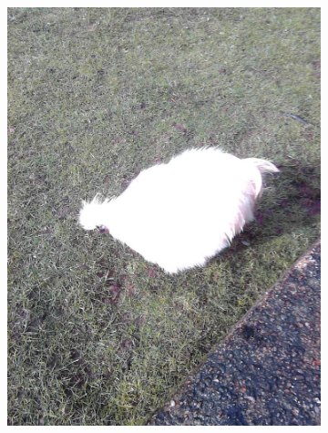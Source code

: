 \documentclass{l4proj}
\begin{document}
\begin{figure}[ht]
\begin{subfigure}[h!]{0.18\textwidth}
    \includegraphics[width=\textwidth, trim={0cm 6cm 0cm 6cm}, clip]{images/dataset/evil_chicken/rgb.png}

\end{subfigure}
\end{figure}
\end{document}
